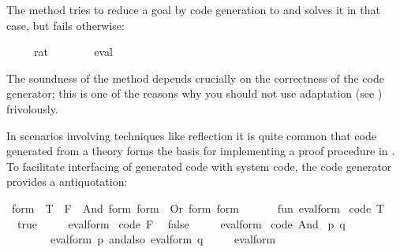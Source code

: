 \begin{isabellebody}
\begin{isamarkuptext}
  The \hyperlink{method.eval}{\mbox{}} method tries to reduce a goal by code generation to 
  and solves it in that case, but fails otherwise:%
\end{isamarkuptext}%
\isamarkuptrue%
%
\isadelimquote
%
\endisadelimquote
%
\isatagquote
{}\isamarkupfalse%
\ {\isachardoublequoteopen}{}{}\ {\isacharslash}\ {\isacharparenleft}{}{}\ {\isacharcolon}{\isacharcolon}\ rat{\isacharparenright}\ {\isacharequal}\ {}\ {\isacharslash}\ {}{\isachardoublequoteclose}\isanewline
\ \ \isamarkupfalse%
\ eval%
\endisatagquote
{\isafoldquote}%
%
\isadelimquote
%
\endisadelimquote
%
\begin{isamarkuptext}%
\noindent The soundness of the \hyperlink{method.eval}{\mbox{}} method depends crucially 
  on the correctness of the code generator;  this is one of the reasons
  why you should not use adaptation (see ) frivolously.%
\end{isamarkuptext}%
\isamarkuptrue%
%
\isamarkuptrue%
%
\begin{isamarkuptext}%
In scenarios involving techniques like reflection it is quite common
  that code generated from a theory forms the basis for implementing
  a proof procedure in .  To facilitate interfacing of generated code
  with system code, the code generator provides a  antiquotation:%
\end{isamarkuptext}%
\isamarkuptrue%
%
\isadelimquote
%
\endisadelimquote
%
\isatagquote
{}\isamarkupfalse%
\ form\ {\isacharequal}\ T\ {\isacharbar}\ F\ {\isacharbar}\ And\ form\ form\ {\isacharbar}\ Or\ form\ form\ %
\endisatagquote
{\isafoldquote}%
%
\isadelimquote
%
\endisadelimquote
%
\isadelimquotett
\ %
\endisadelimquotett
%
\isatagquotett
{}\isamarkupfalse%
\ {\isacharverbatimopen}\isanewline
\ \ fun\ eval{\isacharunderscore}form\ %
\isaantiq
code\ T%
\endisaantiq
\ {\isacharequal}\ true\isanewline
\ \ \ \ {\isacharbar}\ eval{\isacharunderscore}form\ %
\isaantiq
code\ F%
\endisaantiq
\ {\isacharequal}\ false\isanewline
\ \ \ \ {\isacharbar}\ eval{\isacharunderscore}form\ {\isacharparenleft}%
\isaantiq
code\ And%
\endisaantiq
\ {\isacharparenleft}p{\isacharcomma}\ q{\isacharparenright}{\isacharparenright}\ {\isacharequal}\isanewline
\ \ \ \ \ \ \ \ eval{\isacharunderscore}form\ p\ andalso\ eval{\isacharunderscore}form\ q\isanewline
\ \ \ \ {\isacharbar}\ eval{\isacharunderscore}form\ {\isacharparenleft}%

\end{isabellebody}
